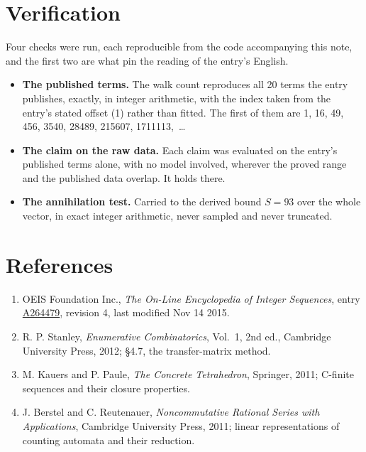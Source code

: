 \documentclass[11pt]{article}
\theoremstyle{definition}
\begin{document}
\section{Verification}

Four checks were run, each reproducible from the code accompanying this note, and the first two are what pin the reading of the entry's English.

\begin{itemize}

\item {\bfseries The published terms.} The walk count reproduces all 20 terms the entry publishes, exactly, in integer arithmetic, with the index taken from the entry's stated offset (1) rather than fitted. The first of them are 1, 16, 49, 456, 3540, 28489, 215607, 1711113,~\dots

\item {\bfseries The claim on the raw data.} Each claim was evaluated on the entry's published terms alone, with no model involved, wherever the proved range and the published data overlap. It holds there.

\item {\bfseries The annihilation test.} Carried to the derived bound $S = 93$ over the whole vector, in exact integer arithmetic, never sampled and never truncated.

\end{itemize}

\section{References}

\begin{enumerate}

\item OEIS Foundation Inc., \emph{The On-Line Encyclopedia of Integer Sequences}, entry \href{https://oeis.org/A264479}{A264479}, revision 4, last modified Nov 14 2015.

\item R. P. Stanley, \emph{Enumerative Combinatorics}, Vol.~1, 2nd ed., Cambridge University Press, 2012; \S4.7, the transfer-matrix method.

\item M. Kauers and P. Paule, \emph{The Concrete Tetrahedron}, Springer, 2011; C-finite sequences and their closure properties.

\item J. Berstel and C. Reutenauer, \emph{Noncommutative Rational Series with Applications}, Cambridge University Press, 2011; linear representations of counting automata and their reduction.

\end{enumerate}
\end{document}
